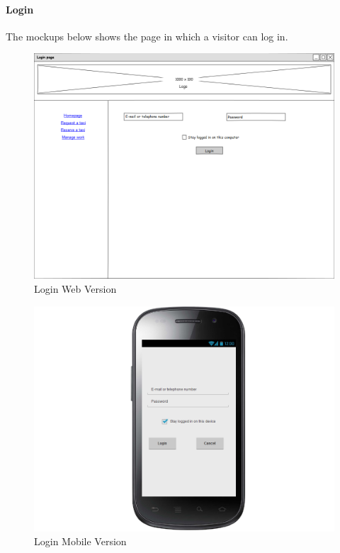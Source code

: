 \documentclass[a4paper,12pt,dvipsnames]{article}%
\begin{document}
\paragraph{Login}
The mockups below shows the page in which a visitor can log in.
\begin{figure}[H]
\centering
\includegraphics[scale=0.35]{mockups/login_web.png}
\caption{Login Web Version}
\end{figure}
\begin{figure}[H]
\centering
\includegraphics[scale=0.35]{mockups/login_mobile.png}
\caption{Login Mobile Version}
\end{figure}
\break
\end{document}
